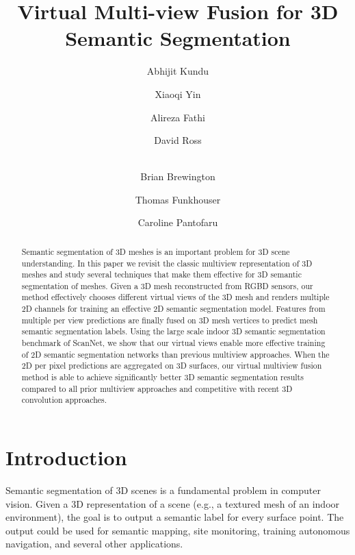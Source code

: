 \documentclass[runningheads]{llncs}
\begin{document}
\pagestyle{headings}
\mainmatter
\def\ECCVSubNumber{4670}  

\title{Virtual Multi-view Fusion for 3D Semantic Segmentation} 

\author{Abhijit Kundu \and
Xiaoqi Yin \and
Alireza Fathi \and
David Ross \and \\
Brian Brewington \and 
Thomas Funkhouser \and
Caroline Pantofaru
}


\maketitle

\begin{abstract}
Semantic segmentation of 3D meshes is an important problem for 3D scene understanding. In this paper we revisit the classic multiview representation of 3D meshes and study several techniques that make them effective for 3D semantic segmentation of meshes. Given a 3D mesh reconstructed from RGBD sensors, our method effectively chooses different virtual views of the 3D mesh and renders multiple 2D channels for training an effective 2D semantic segmentation model. Features from multiple per view predictions are finally fused on 3D mesh vertices to predict mesh semantic segmentation labels. Using the large scale indoor 3D semantic segmentation benchmark of ScanNet, we show that our virtual views enable more effective training of 2D semantic segmentation networks than previous multiview approaches. When the 2D per pixel predictions are aggregated on 3D surfaces, our virtual multiview fusion method is able to achieve significantly better 3D semantic segmentation results compared to all prior multiview approaches and competitive with recent 3D convolution approaches.

\end{abstract}

\section{Introduction}

Semantic segmentation of 3D scenes is a fundamental problem in computer vision.  Given a 3D representation of a scene (e.g., a textured mesh of an indoor environment), the goal is to output a semantic label for every surface point.  The output could be used for semantic mapping, site monitoring, training autonomous navigation, and several other applications.
\end{document}
